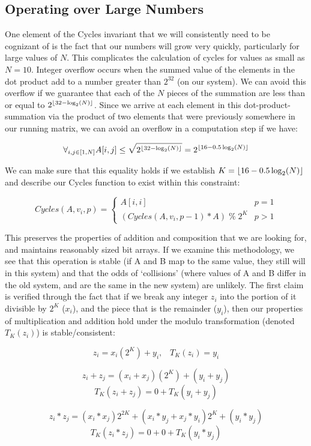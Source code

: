 \subsection{Operating over Large Numbers}
One element of the Cycles invariant that we will consistently need to be cognizant of is the fact that our numbers will grow very quickly, particularly for large values of $N$.
This complicates the calculation of cycles for values as small as $N=10$.
Integer overflow occurs when the summed value of the elements in the dot product add to a number greater than $2^{32}$ (on our system).
We can avoid this overflow if we guarantee that each of the $N$ pieces of the summation are less than or equal to $2^{\lfloor32 - \log_2(N)\rfloor}$.
Since we arrive at each element in this dot-product-summation via the product of two elements that were previously somewhere in our running matrix, we can avoid an overflow in a computation step if we have:

$$ \forall_{i, j \in [1, N]} A[i, j] \leq \sqrt{2^{\lfloor32 - \log_2(N)\rfloor}} = 2^{\lfloor16 - 0.5\log_2(N)\rfloor}$$

We can make sure that this equality holds if we establish $K = \lfloor16 - 0.5\log_2(N)\rfloor$ and describe our Cycles function to exist within this constraint:

$$ Cycles(A, v_i, p) = \begin{cases} 
      A[i,i] & p = 1 \\
      (Cycles(A, v_i, p-1) * A) \; \% \; 2^K  & p > 1
\end{cases}$$

This preserves the properties of addition and composition that we are looking for, and maintains reasonably sized bit arrays.
If we examine this methodology, we see that this operation is stable (if A and B map to the same value, they still will in this system) and that the odds of `collisions' (where values of A and B differ in the old system, and are the same in the new system) are unlikely.
The first claim is verified through the fact that if we break any integer $z_i$ into the portion of it divisible by $2^K$ ($x_i$), and the piece that is the remainder ($y_i$), then our properties of multiplication and addition hold under the modulo transformation (denoted $T_K(z_i)$) is stable/consistent:

$$z_i =  x_i(2^K) + y_i , \;\;\;T_K(z_i) = y_i$$

$$z_i + z_j = (x_i + x_j)(2^K) + (y_i + y_j)$$
$$T_K(z_i + z_j) = 0 + T_K(y_i + y_j)$$

$$z_i * z_j = (x_i*x_j)2^{2K} + (x_i*y_j + x_j*y_i)2^K + (y_i * y_j)$$
$$T_K(z_i * z_j) = 0 + 0 + T_K(y_i * y_j)$$

